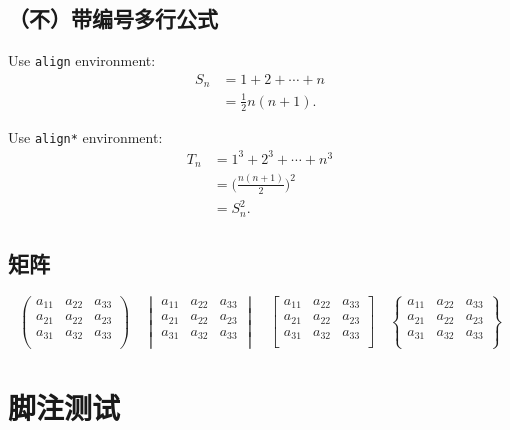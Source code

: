 \subsection{（不）带编号多行公式}

Use \texttt{align} environment:
\begin{align}
    S_n & = 1 + 2 + \cdots + n \\
        & = \frac12 n(n+1).
\end{align}

Use \texttt{align*} environment:
\begin{align*}
    T_n & = 1^3 + 2^3 + \cdots + n^3         \\
        & = \biggl(\frac{n(n+1)}{2}\biggr)^2 \\
        & = S_n^2.
\end{align*}

\subsection{矩阵}

\[
    \begin{pmatrix}
        a_{11} & a_{22} & a_{33} \\
        a_{21} & a_{22} & a_{23} \\
        a_{31} & a_{32} & a_{33} \\
    \end{pmatrix} \quad
    \begin{vmatrix}
        a_{11} & a_{22} & a_{33} \\
        a_{21} & a_{22} & a_{23} \\
        a_{31} & a_{32} & a_{33} \\
    \end{vmatrix} \quad
    \begin{bmatrix}
        a_{11} & a_{22} & a_{33} \\
        a_{21} & a_{22} & a_{23} \\
        a_{31} & a_{32} & a_{33} \\
    \end{bmatrix} \quad
    \begin{Bmatrix}
        a_{11} & a_{22} & a_{33} \\
        a_{21} & a_{22} & a_{23} \\
        a_{31} & a_{32} & a_{33} \\
    \end{Bmatrix}\]

\section{脚注测试}

